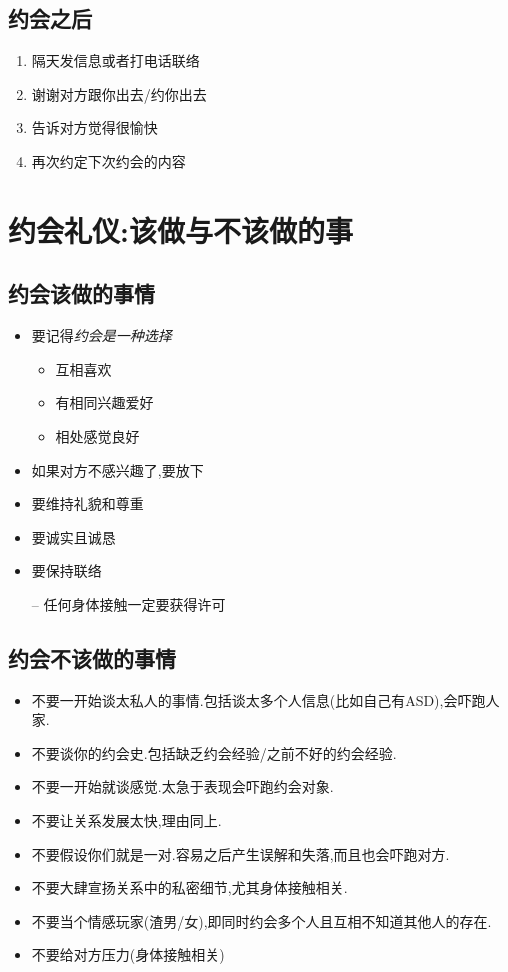 \documentclass[UTF8]{article}
\newcommand{\dash}{–}
\begin{document}
\subsection{约会之后}
\begin{enumerate}
    \item 隔天发信息或者打电话联络
    \item 谢谢对方跟你出去/约你出去
    \item 告诉对方觉得很愉快
    \item 再次约定下次约会的内容
\end{enumerate}

\newpage
\section{约会礼仪:该做与不该做的事}

\subsection{约会该做的事情}
\begin{itemize}
    \item 要记得\emph{约会是一种选择}\begin{itemize}[label=*]
        \item 互相喜欢
        \item 有相同兴趣爱好
        \item 相处感觉良好
    \end{itemize}
    \item 如果对方不感兴趣了,要放下
    \item 要维持礼貌和尊重
    \item 要诚实且诚恳
    \item 要保持联络
    \item[\dash] 任何身体接触一定要获得许可
\end{itemize}

\subsection{约会不该做的事情}
\begin{itemize}[label=\dash]
    \item 不要一开始谈太私人的事情.包括谈太多个人信息(比如自己有ASD),会吓跑人家.
    \item 不要谈你的约会史.包括缺乏约会经验/之前不好的约会经验.
    \item 不要一开始就谈感觉.太急于表现会吓跑约会对象.
    \item 不要让关系发展太快,理由同上.
    \item 不要假设你们就是一对.容易之后产生误解和失落,而且也会吓跑对方.
    \item 不要大肆宣扬关系中的私密细节,尤其身体接触相关.
    \item 不要当个情感玩家(渣男/女),即同时约会多个人且互相不知道其他人的存在.
    \item 不要给对方压力(身体接触相关)
\end{itemize}
\end{document}
